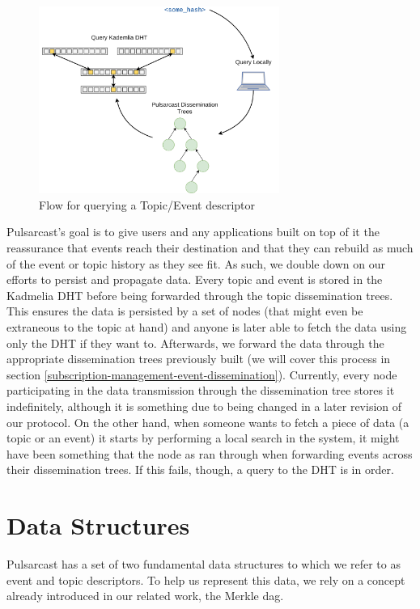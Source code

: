 \begin{figure}[hb!]
  \centering
  \includegraphics[width=0.7\textwidth]{img/pulsarcast-descriptor-query.png}
  \caption{Flow for querying a Topic/Event descriptor}
  \label{fig:pulsarcast-descriptor-query}
\end{figure}

Pulsarcast's goal is to give users and any applications built on top of it the
reassurance that events reach their destination and that they can rebuild as
much of the event or topic history as they see fit. As such, we double down on
our efforts to persist and propagate data. Every topic and event is stored in
the Kadmelia DHT before being forwarded through the topic dissemination trees.
This ensures the data is persisted by a set of nodes (that might even be
extraneous to the topic at hand) and anyone is later able to fetch the data
using only the DHT if they want to. Afterwards, we forward the data through the
appropriate dissemination trees previously built (we will cover this process in
section \ref{subscription-management-event-dissemination}). Currently, every node participating in the data transmission
through the dissemination tree stores it indefinitely, although it is something
due to being changed in a later revision of our protocol. On the other hand,
when someone wants to fetch a piece of data (a topic or an event) it starts by
performing a local search in the system, it might have been something that the
node as ran through when forwarding events across their dissemination trees. If
this fails, though, a query to the DHT is in order.

\section{Data Structures}\label{data-structures}

Pulsarcast has a set of two fundamental data structures to which we refer to as
event and topic descriptors. To help us represent this data, we rely on a
concept already introduced in our related work, the Merkle \acrshort{dag}.

